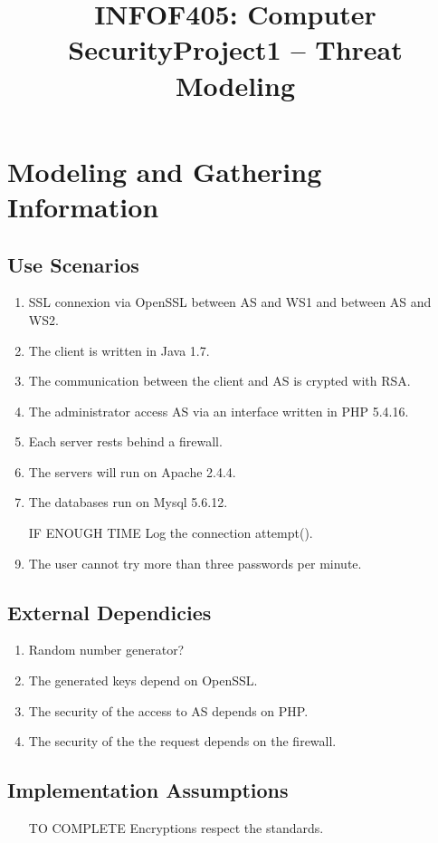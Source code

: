 \documentclass[11pt]{article}
\title{INFOF405: Computer Security\newline{}Project1 -- Threat Modeling}
\begin{document}
\maketitle

\section{Modeling and Gathering Information}

\subsection{Use Scenarios}

\begin{enumerate}
	\item SSL connexion via OpenSSL between AS and WS1 and between AS and WS2.
	\item The client is written in Java 1.7.
	\item The communication between the client and AS is crypted with RSA.
	\item The administrator access AS via an interface written in PHP 5.4.16.
	\item Each server rests behind a firewall.
	\item The servers will run on Apache 2.4.4.
	\item The databases run on Mysql 5.6.12.
	\item [IF ENOUGH TIME] Log the connection attempt().
	\item The user cannot try more than three passwords per minute.
\end{enumerate}

\subsection{External Dependicies}
\begin{enumerate}
	\item Random number generator?
	\item The generated keys depend on OpenSSL.
	\item The security of the access to AS depends on PHP.
	\item The security of the the request depends on the firewall.
\end{enumerate}

\subsection{Implementation Assumptions}
\begin{enumerate}
	\item [TO COMPLETE]Encryptions respect the standards.
\end{enumerate}
\end{document}
